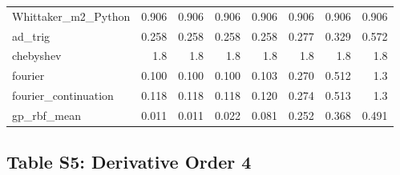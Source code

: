 \documentclass[10pt]{article}
\begin{document}
\begin{longtable}{lrrrrrrr}
Whittaker\_m2\_Python & 0.906 & 0.906 & 0.906 & 0.906 & 0.906 & 0.906 & 0.906 \\
ad\_trig & 0.258 & 0.258 & 0.258 & 0.258 & 0.277 & 0.329 & 0.572 \\
chebyshev & 1.8 & 1.8 & 1.8 & 1.8 & 1.8 & 1.8 & 1.8 \\
fourier & 0.100 & 0.100 & 0.100 & 0.103 & 0.270 & 0.512 & 1.3 \\
fourier\_continuation & 0.118 & 0.118 & 0.118 & 0.120 & 0.274 & 0.513 & 1.3 \\
gp\_rbf\_mean & 0.011 & 0.011 & 0.022 & 0.081 & 0.252 & 0.368 & 0.491 \\
\bottomrule
\end{longtable}

\clearpage

\subsection*{Table S5: Derivative Order 4}
\end{document}
